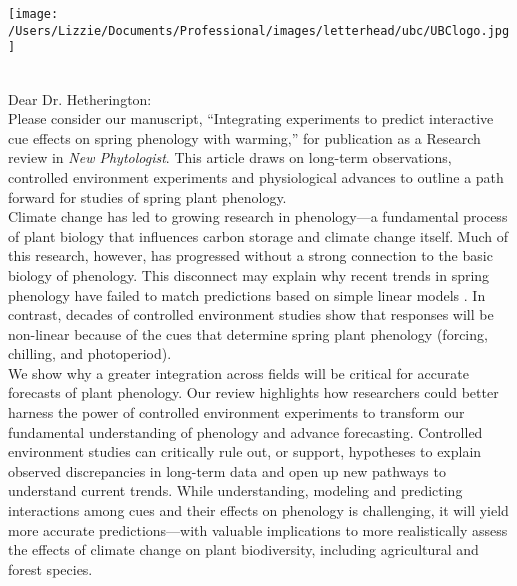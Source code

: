 \documentclass[11pt,a4paper]{article}
\begin{document}
\renewcommand{\refname}{\CHead{}}
    \begin{flushright}
\texttt{[image: /Users/Lizzie/Documents/Professional/images/letterhead/ubc/UBClogo.jpg]}
    \end{flushright}

\vspace{1.5ex}\\
Dear Dr. Hetherington:
\vspace{1.5ex}\\
Please consider our manuscript, ``Integrating experiments to predict interactive cue effects on spring phenology with warming,'' for publication as a Research review in \emph{New Phytologist}. This article draws on long-term observations, controlled environment experiments and physiological advances to outline a path forward for studies of spring plant phenology. 
\vspace{1.5ex}\\
Climate change has led to growing research in phenology---a fundamental process of plant biology that influences carbon storage and climate change itself. Much of this research, however, has progressed without a strong connection to the basic biology of phenology. This disconnect may explain why recent trends in spring phenology have failed to match predictions based on simple linear models \citep{fu2015,piao2017}. In contrast, decades of controlled environment studies show that responses will be non-linear because of the cues that determine spring plant phenology (forcing, chilling, and photoperiod).
\vspace{1.5ex}\\
We show why a greater integration across fields will be critical for accurate forecasts of plant phenology. Our review highlights how researchers could better harness the power of controlled environment experiments to transform our fundamental understanding of phenology and advance forecasting. Controlled environment studies can critically rule out, or support, hypotheses to explain observed discrepancies in long-term data and open up new pathways to understand current trends. While understanding, modeling and predicting interactions among cues and their effects on phenology is challenging, it will yield more accurate predictions---with valuable implications to more realistically assess the effects of climate change on plant biodiversity, including agricultural and forest species. 
\end{document}
